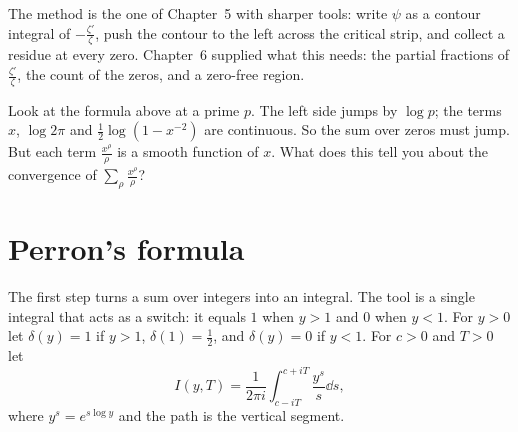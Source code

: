 The method is the one of Chapter~5 with sharper tools: write $\psi$ as a contour integral of $-\frac{\zeta'}\zeta$, push the contour to the left across the critical strip,
and collect a residue at every zero. Chapter~6 supplied what this needs: the partial fractions of $\frac{\zeta'}\zeta$, the count of the zeros, and a zero-free region.

\begin{think}
Look at the formula above at a prime $p$. The left side jumps by $\log p$; the terms $x$, $\log2\pi$ and $\frac12\log(1-x^{-2})$ are continuous. So the sum over zeros must jump.
But each term $\frac{x^\rho}\rho$ is a smooth function of $x$. What does this tell you about the convergence of $\sum_\rho\frac{x^\rho}\rho$?
\end{think}

\section{Perron's formula}

The first step turns a sum over integers into an integral. The tool is a single integral that acts as a switch: it equals $1$ when $y>1$ and $0$ when $y<1$.
For $y>0$ let $\delta(y)=1$ if $y>1$, $\delta(1)=\frac12$, and $\delta(y)=0$ if $y<1$. For $c>0$ and $T>0$ let
\[
I(y,T)=\frac1{2\pi i}\int_{c-iT}^{c+iT}\frac{y^s}s\dd s,
\]
where $y^s=e^{s\log y}$ and the path is the vertical segment.

